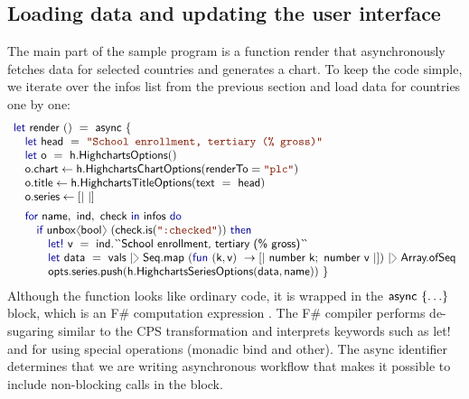 \documentclass[submission,copyright,creativecommons]{eptcs}
\newcommand{\langl}{\begin{picture}(4.5,7)
\put(1.1,2.5){\rotatebox{60}{\line(1,0){5.5}}}
\put(1.1,2.5){\rotatebox{300}{\line(1,0){5.5}}}
\end{picture}}
\newcommand{\rangl}{\begin{picture}(4.5,7)
\put(.9,2.5){\rotatebox{120}{\line(1,0){5.5}}}
\put(.9,2.5){\rotatebox{240}{\line(1,0){5.5}}}
\end{picture}}
\newcommand{\rang}{\begin{picture}(5,7)
\put(.1,2.5){\rotatebox{135}{\line(1,0){6.0}}}
\put(.1,2.5){\rotatebox{225}{\line(1,0){6.0}}}
\end{picture}}
\newcommand{\kvd}[1]{\textnormal{\textcolor{kvdclr}{\sffamily #1}}}
\newcommand{\str}[1]{\textnormal{\textcolor{strclr}{\ttfamily "#1"}}}
\newcommand{\ident}[1]{\textnormal{\sffamily #1}}
\newcommand{\lident}[1]{\textnormal{\sffamily 
  \`{}\hspace{-0.25em}\`{}\hspace{-0.1em}#1\`{}\hspace{-0.25em}\`{}}}
\begin{document}

\subsection{Loading data and updating the user interface}
\label{sec:case-loading}

The main part of the sample program is a function \ident{render} that asynchronously fetches 
data for selected countries and generates a chart. To keep the code simple, we iterate over the 
\ident{infos} list from the previous section and load data for countries one by one:
%
\begin{equation*}
\begin{array}{lll}
 \kvd{let}~\ident{render}~()~=~\ident{async}~\{ \\
 \quad \kvd{let}~\ident{head}~=~\str{School enrollment, tertiary (\% gross)} \\
 \quad \kvd{let}~\ident{o}~=~\ident{h.HighchartsOptions}() \\
 \quad \ident{o.chart} \leftarrow \ident{h.HighchartsChartOptions}(\ident{renderTo}=\str{plc}) \\
 \quad \ident{o.title} \leftarrow \ident{h.HighchartsTitleOptions}(\ident{text}~=~\ident{head}) \\
 \quad \ident{o.series} \leftarrow \lbrack| ~ |\rbrack
 \\[0.5em]   
 \quad \kvd{for}~\ident{name},~\ident{ind},~\ident{check}~\kvd{in}~\ident{infos}~\kvd{do}\\
 \qquad   \kvd{if}~\ident{unbox}\langl \ident{bool} \rangl~(\ident{check.is}(\str{:checked}))~\kvd{then} \\
 \qquad\quad     \kvd{let!}~\ident{v}~=~\ident{ind.}\lident{School enrollment, tertiary (\% gross)} \\
 \qquad\quad     \kvd{let}~\ident{data}~=~\ident{vals}~
                   |\rang~\ident{Seq.map}~(\kvd{fun}~(\ident{k}, \ident{v})~\rightarrow \lbrack|~\ident{number~k};~\ident{number~v} ~|\rbrack)~
                   |\rang~\ident{Array.ofSeq} \\
 \qquad\quad     \ident{opts.series.push}(\ident{h.HighchartsSeriesOptions}(\ident{data}, \ident{name})) ~\}
\end{array}
\end{equation*}
%
Although the function looks like ordinary code, it is wrapped in the $\ident{async}~\{\ldots\}$ 
block, which is an F\# computation expression \cite{fsharp-zoo}. The F\# compiler performs 
de-sugaring similar to the CPS transformation and interprets keywords such as \kvd{let!} and 
\kvd{for} using special operations (monadic bind and other). The \ident{async} identifier 
determines that we are writing asynchronous workflow \cite{fsharp-async} that makes it 
possible to include non-blocking calls in the block.
\end{document}
